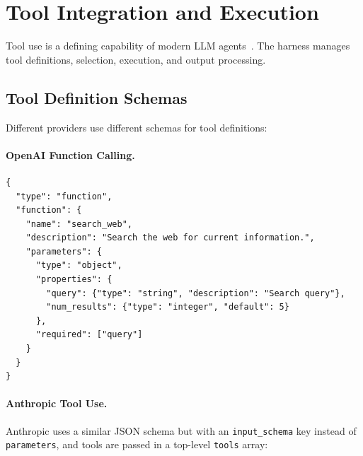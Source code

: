 \section{Tool Integration and Execution}
\label{tool-integration-and-execution}

Tool use is a defining capability of modern LLM agents~\cite{schick2023toolformer}. The harness manages tool definitions, selection, execution, and output processing.

\subsection{Tool Definition Schemas}
\label{tool-definition-schemas}

Different providers use different schemas for tool definitions:

\paragraph{OpenAI Function Calling.}
\label{openai-function-calling.}

\begin{examplebox}
\begin{lstlisting}[style=pythonstyle]
{
  "type": "function",
  "function": {
    "name": "search_web",
    "description": "Search the web for current information.",
    "parameters": {
      "type": "object",
      "properties": {
        "query": {"type": "string", "description": "Search query"},
        "num_results": {"type": "integer", "default": 5}
      },
      "required": ["query"]
    }
  }
}
\end{lstlisting}
\end{examplebox}

\paragraph{Anthropic Tool Use.}
\label{anthropic-tool-use.}

Anthropic uses a similar JSON schema but with an \texttt{input\_schema} key instead of \texttt{parameters}, and tools are passed in a top-level \texttt{tools} array:


